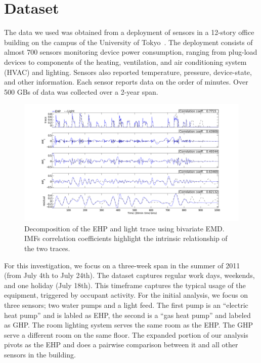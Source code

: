 \section{Dataset}
The data we used was obtained from a deployment of sensors in a 12-story office building
on the campus of the University of Tokyo~\cite{gutp, ogawa:lncs2011}.  The deployment consists of 
almost 700 sensors monitoring device power consumption, ranging from plug-load devices to components of the
heating, ventilation, and air conditioning system (HVAC) and lighting.  Sensors also reported temperature, 
pressure, device-state, and other information.  Each sensor reports data on the
order of minutes.  Over 500 GBs of data was collected over a 2-year span.

\begin{figure}[tb]
\hspace{-2cm}
\includegraphics[width=1.2\textwidth]{img/emd_25_26-eps-converted-to}
\vspace{-1cm}
\caption{Decomposition of the EHP and light trace using bivariate EMD. IMFs correlation coefficients highlight the intrinsic relationship of the two traces.}
\label{fig:emd}
\end{figure}



For this investigation, we focus on a three-week span in the summer of 2011 (from July 4th to July 24th).
The dataset captures regular work days, weekends, and one holiday (July 18th).  This timeframe captures
the typical usage of the equipment, triggered by occupant activity.  For the initial
analysis, we focus on three sensors; two water pumps and a light feed.  The first pump is an 
``electric heat pump'' and is labled as EHP, the second  is a ``gas heat pump''
and labeled as GHP.  The room lighting system serves the same room as the EHP.  The GHP
serve a different room on the same floor.  The expanded portion of our analysis pivots as the EHP
and does a pairwise comparison between it and all other sensors in the building.

